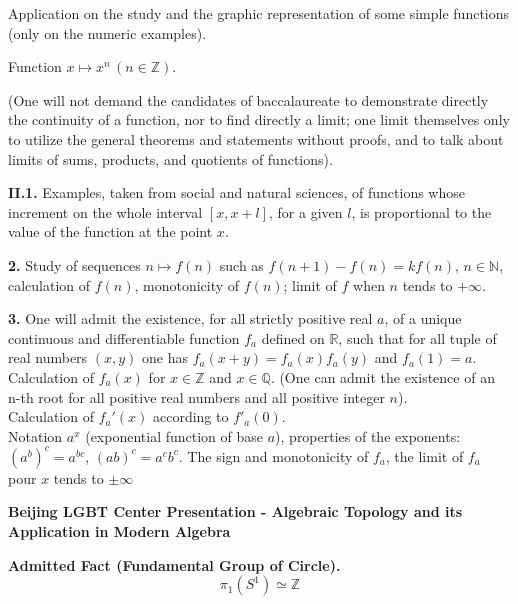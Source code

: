 \documentclass[10pt]{article}
\begin{document}
\begin{CJK*}{UTF8}{gbsn}
Application on the study and the graphic representation of some simple functions (only on the numeric examples).

Function $x\mapsto x^n\,(n\in\mathbb{Z})$.

(One will not demand the candidates of baccalaureate to demonstrate directly the continuity of a function, nor to find directly a limit; one limit themselves only to utilize the general theorems and statements without proofs, and to talk about limits of sums, products, and quotients of functions).

\textbf{II.1.} Examples, taken from social and natural sciences, of functions whose increment on the whole interval $[x,x+l]$, for a given $l$, is proportional to the value of the function at the point $x$.

\textbf{2.} Study of sequences $n\mapsto f(n)$ such as $f(n+1)-f(n)=kf(n)$, $n\in\mathbb{N}$, calculation of $f(n)$, monotonicity of $f(n)$; limit of $f$ when $n$ tends to $+\infty$.

\textbf{3.} One will admit the existence, for all strictly positive real $a$, of a unique continuous and differentiable function $f_a$ defined on $\mathbb{R}$, such that for all tuple of real numbers $(x,y)$ one has $f_a(x+y)=f_a(x)f_a(y)$ and $f_a(1)=a$. Calculation of $f_a(x)$ for $x\in\mathbb{Z}$ and $x\in\mathbb{Q}$. (One can admit the existence of an n-th root for all positive real numbers and all positive integer $n$).\\
Calculation of $f_a'(x)$ according to $f'_a(0)$.\\
Notation $a^x$ (exponential function of base $a$), properties of the exponents: $(a^b)^c=a^{bc}$, $(ab)^c=a^cb^c$. The sign and monotonicity of $f_a$, the limit of $f_a$ pour $x$ tends to $\pm\infty$

\newpage
\textbf{Beijing LGBT Center Presentation - Algebraic Topology and its Application in Modern Algebra}

\textbf{Admitted Fact (Fundamental Group of Circle).} $$\pi_1(S^1)\simeq\mathbb{Z}$$


\end{CJK*}
\end{document}
